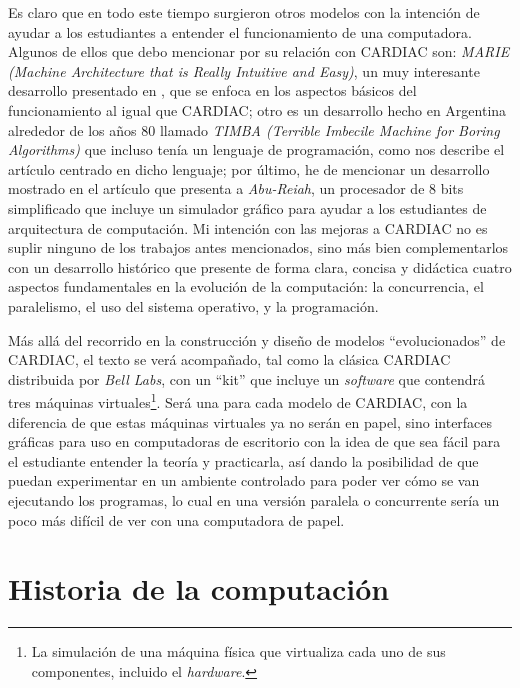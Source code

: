 \documentclass[letterpaper,12pt,oneside]{book}
\begin{document}
	Es claro que en todo este tiempo surgieron otros modelos con la intención de ayudar a los estudiantes a entender el funcionamiento de una computadora. Algunos
	de ellos que debo mencionar por su relación con CARDIAC son: \textit{MARIE (Machine Architecture that is Really Intuitive and Easy)}, un muy interesante 
	desarrollo presentado en \cite{null_essentials_2003}, que se enfoca en los aspectos básicos del funcionamiento al igual que CARDIAC; otro es un desarrollo
	hecho en Argentina alrededor de los años 80 llamado \textit{TIMBA (Terrible Imbecile Machine for Boring Algorithms)} que incluso tenía un lenguaje de programación,
	como nos describe el artículo \cite{alvaro_frias_retruco_2022} centrado en dicho lenguaje; por último, he de mencionar un desarrollo
	mostrado en el artículo \cite{ajdari_design_2012} que presenta a \textit{Abu-Reiah}, un procesador de 8 bits simplificado que incluye un simulador 
	gráfico
	para ayudar a los estudiantes de arquitectura de computación. Mi intención con las mejoras a CARDIAC no es suplir ninguno de los trabajos antes mencionados,
	sino más bien complementarlos con un desarrollo histórico que presente de forma clara, concisa y didáctica cuatro aspectos fundamentales en la evolución
	de la computación: la concurrencia, el paralelismo, el uso del sistema operativo, y la programación.
	
	
	Más allá del recorrido en la construcción y diseño de modelos ``evolucionados'' de CARDIAC, el texto se verá acompañado,
	tal como la clásica CARDIAC distribuida por \textit{Bell Labs}, con un ``kit'' que incluye un \textit{software} que contendrá tres máquinas virtuales\footnote{La simulación de una
	máquina física que virtualiza cada uno de sus componentes, incluido el \textit{hardware}.}. Será una para cada
	modelo de CARDIAC, con la diferencia de que estas máquinas virtuales ya no serán en papel, sino interfaces gráficas para uso en computadoras de escritorio con la idea de 
	que sea fácil para el estudiante
	entender la teoría y practicarla, así dando la posibilidad de que puedan experimentar en un ambiente controlado para poder ver cómo se van ejecutando los programas, lo cual en una versión paralela o concurrente sería un poco más difícil de ver con una 
	computadora de papel.

	

\tableofcontents
\listoffigures

\mainmatter

\chapter{Historia de la computación} 
\end{document}
